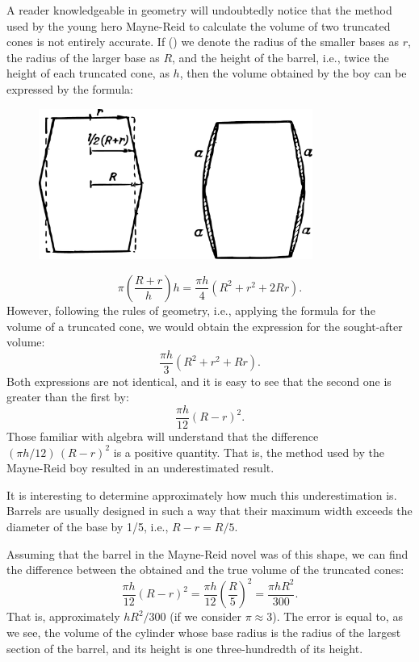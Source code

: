 A reader knowledgeable in geometry will undoubtedly notice that the method used by the young hero Mayne-Reid to calculate the volume of two truncated cones is not entirely accurate. If () we denote the radius of the smaller bases as $r$, the radius of the larger base as $R$, and the height of the barrel, i.e., twice the height of each truncated cone, as $h$, then the volume obtained by the boy can be expressed by the formula:
\begin{figure}[h!]
\centering
\includegraphics[width=0.8\textwidth]{figures/ch-08/fig-109.pdf}
\end{figure}
\begin{equation*}%
\pi \left( \frac{R + r}{h} \right) h = \frac{\pi h}{4} (R^{2} + r^{2} + 2Rr).
\end{equation*}
However, following the rules of geometry, i.e., applying the formula for the volume of a truncated cone, we would obtain the expression for the sought-after volume:
\begin{equation*}%
\frac{\pi h}{3} (R^{2} + r^{2} + Rr).
\end{equation*}
Both expressions are not identical, and it is easy to see that the second one is greater than the first by:
\begin{equation*}%
\frac{\pi h}{12} (R - r)^{2}.
\end{equation*}
Those familiar with algebra will understand that the difference  $(πh/12) \, (R - r)^{2}$ is a positive quantity. That is, the method used by the Mayne-Reid boy resulted in an underestimated result.

It is interesting to determine approximately how much this underestimation is. Barrels are usually designed in such a way that their maximum width exceeds the diameter of the base by 1/5, i.e., $R - r = R/5$.

Assuming that the barrel in the Mayne-Reid novel was of this shape, we can find the difference between the obtained and the true volume of the truncated cones:
\begin{equation*}%
\frac{\pi h}{12} (R - r)^{2} = \frac{\pi h}{12} \left(\frac{R}{5}\right)^{2} = \frac{\pi hR^{2}}{300}.
\end{equation*}
That is, approximately $hR^{2}/300$ (if we consider $\pi \approx 3 $). The error is equal to, as we see, the volume of the cylinder whose base radius is the radius of the largest section of the barrel, and its height is one three-hundredth of its height.

